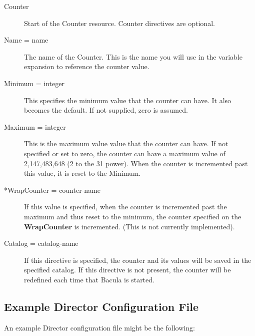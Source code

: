 \begin{description}

\item [Counter] 
   Start of the Counter resource.  Counter directives are optional. 

\item [Name = \lt{}name\gt{}]
   The name of the Counter.  This is the name you will use in the variable
expansion  to reference the counter value.  

\item [Minimum = \lt{}integer\gt{}]
   This specifies the minimum  value that the counter can have. It also becomes
the default.  If not supplied, zero is assumed.  

\item [Maximum = \lt{}integer\gt{}]
   This is the maximum value  value that the counter can have. If not specified
or set to  zero, the counter can have a maximum value of 2,147,483,648  (2 to
the 31 power). When the counter is incremented past  this value, it is reset
to the Minimum.  

\item [*WrapCounter = \lt{}counter-name\gt{}]
   If this value  is specified, when the counter is incremented past the maximum 
and thus reset to the minimum, the counter specified on the  {\bf WrapCounter}
is incremented. (This is not currently  implemented). 

\item [Catalog = \lt{}catalog-name\gt{}]
   If this directive is  specified, the counter and its values will be saved in 
the specified catalog. If this directive is not present, the  counter will be
redefined each time that Bacula is started. 
\end{description}

\subsection*{Example Director Configuration File}
\label{SampleDirectorConfiguration}

An example Director configuration file might be the following: 

